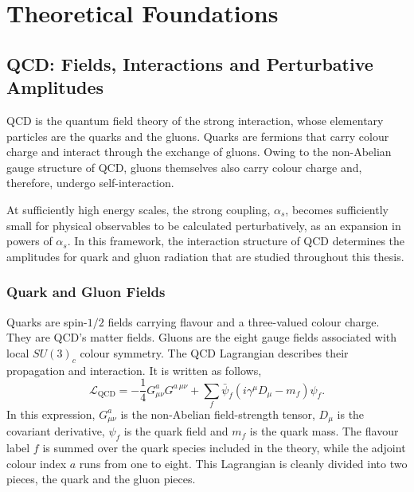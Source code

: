 \chapter{Theoretical Foundations}\label{ch:physicsbackground}

\section{QCD: Fields, Interactions and Perturbative Amplitudes}

QCD is the quantum field theory of the strong interaction, whose elementary 
particles are the quarks and
the gluons. Quarks are fermions that carry colour charge and interact through
the exchange of gluons. Owing to the non-Abelian gauge structure of QCD, gluons 
themselves also 
carry colour charge and, therefore, undergo self-interaction. 

At sufficiently high energy scales, the strong coupling, $\alpha_s$, becomes
sufficiently small for physical observables to be calculated perturbatively, as an expansion 
in powers of $\alpha_s$. In this framework, the interaction structure of QCD determines
the amplitudes for quark and gluon radiation that are studied throughout this thesis.

\subsection{Quark and Gluon Fields}\label{subsec:quarksAndGluons}

Quarks are spin-$1/2$ fields carrying flavour and a three-valued colour charge. 
They are QCD's matter fields. Gluons are the eight gauge fields associated with 
local $SU(3)_c$ colour symmetry. The QCD Lagrangian describes their propagation 
and interaction. It is written as follows,
\begin{equation}\label{eq:qcdLagrangian}
    \mathcal L_\mathrm{QCD} = -\frac14G_{\mu\nu}^aG^{a\,\mu\nu}+\sum_f\bar\psi_f\!\left(i\gamma^\mu D_\mu-m_f\right)\psi_f.
\end{equation}
In this expression, $G_{\mu\nu}^a$ is the non-Abelian field-strength tensor, $D_\mu$
is the covariant derivative, $\psi_f$ is the quark field and $m_f$ is the quark mass.
The flavour label $f$ is summed over the quark species included in the theory, while 
the adjoint colour index $a$ runs from one to eight.
This Lagrangian is 
cleanly divided into two pieces, the quark and the gluon pieces. 

